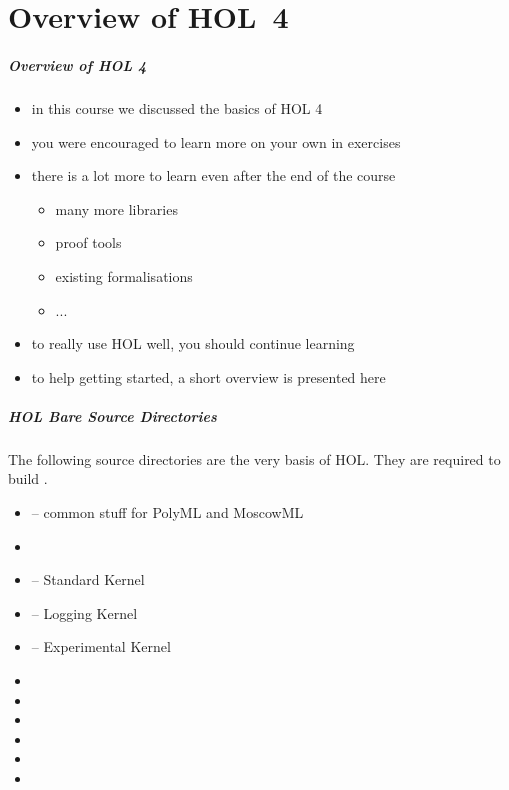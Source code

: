 \part{Overview of HOL~4}

\frame[plain]{\partpage}

\begin{frame}
\frametitle{Overview of HOL 4}

\begin{itemize}
\item in this course we discussed the basics of HOL 4
\item you were encouraged to learn more on your own in exercises
\item there is a lot more to learn even after the end of the course
\begin{itemize}
\item many more libraries
\item proof tools
\item existing formalisations
\item ...
\end{itemize}
\item to really use HOL well, you should continue learning
\item to help getting started, a short overview is presented here
\end{itemize}
\end{frame}


\begin{frame}
\frametitle{HOL Bare Source Directories}

The following source directories are the very basis of HOL. They
are required to build .

\begin{itemize}
\item {} -- common stuff for PolyML and MoscowML
\item {}
\item {} -- Standard Kernel
\item {} -- Logging Kernel
\item {} -- Experimental Kernel
\item {}
\item {}
\item {}
\item {}
\item {}
\item {}
\end{itemize}
\end{frame}

